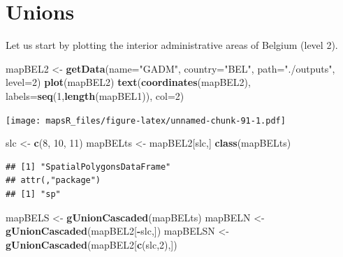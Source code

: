 \documentclass[]{report}
\newenvironment{Shaded}{\begin{snugshade}}{\end{snugshade}}
\newcommand{\DataTypeTok}[1]{\textcolor[rgb]{0.13,0.29,0.53}{#1}}
\newcommand{\DecValTok}[1]{\textcolor[rgb]{0.00,0.00,0.81}{#1}}
\newcommand{\KeywordTok}[1]{\textcolor[rgb]{0.13,0.29,0.53}{\textbf{#1}}}
\newcommand{\NormalTok}[1]{#1}
\newcommand{\OperatorTok}[1]{\textcolor[rgb]{0.81,0.36,0.00}{\textbf{#1}}}
\newcommand{\StringTok}[1]{\textcolor[rgb]{0.31,0.60,0.02}{#1}}
\begin{document}
\hypertarget{unions}{%
\section{Unions}\label{unions}}

Let us start by plotting the interior administrative areas of Belgium
(level 2).

\begin{Shaded}
\begin{Highlighting}[]
\NormalTok{mapBEL2 <-}\StringTok{ }\KeywordTok{getData}\NormalTok{(}\DataTypeTok{name=}\StringTok{"GADM"}\NormalTok{, }\DataTypeTok{country=}\StringTok{"BEL"}\NormalTok{, }\DataTypeTok{path=}\StringTok{"./outputs"}\NormalTok{, }\DataTypeTok{level=}\DecValTok{2}\NormalTok{)}
\KeywordTok{plot}\NormalTok{(mapBEL2)}
\KeywordTok{text}\NormalTok{(}\KeywordTok{coordinates}\NormalTok{(mapBEL2), }\DataTypeTok{labels=}\KeywordTok{seq}\NormalTok{(}\DecValTok{1}\NormalTok{,}\KeywordTok{length}\NormalTok{(mapBEL1)), }\DataTypeTok{col=}\DecValTok{2}\NormalTok{)}
\end{Highlighting}
\end{Shaded}

\texttt{[image: mapsR\_files/figure-latex/unnamed-chunk-91-1.pdf]}

\begin{Shaded}
\begin{Highlighting}[]
\NormalTok{slc <-}\StringTok{ }\KeywordTok{c}\NormalTok{(}\DecValTok{8}\NormalTok{, }\DecValTok{10}\NormalTok{, }\DecValTok{11}\NormalTok{)}
\NormalTok{mapBELts <-}\StringTok{ }\NormalTok{mapBEL2[slc,]}
\KeywordTok{class}\NormalTok{(mapBELts)}
\end{Highlighting}
\end{Shaded}

\begin{verbatim}
## [1] "SpatialPolygonsDataFrame"
## attr(,"package")
## [1] "sp"
\end{verbatim}

\begin{Shaded}
\begin{Highlighting}[]
\NormalTok{mapBELS <-}\StringTok{ }\KeywordTok{gUnionCascaded}\NormalTok{(mapBELts)}
\NormalTok{mapBELN <-}\StringTok{ }\KeywordTok{gUnionCascaded}\NormalTok{(mapBEL2[}\OperatorTok{-}\NormalTok{slc,])}
\NormalTok{mapBELSN <-}\StringTok{ }\KeywordTok{gUnionCascaded}\NormalTok{(mapBEL2[}\KeywordTok{c}\NormalTok{(slc,}\DecValTok{2}\NormalTok{),])}
\end{Highlighting}
\end{Shaded}
\end{document}

